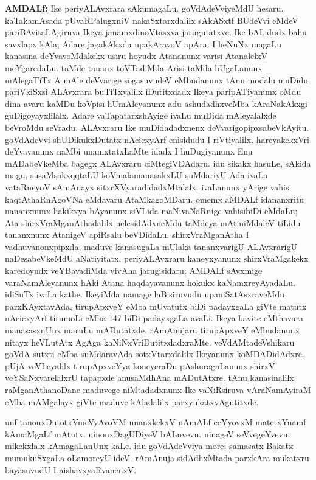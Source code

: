 {\large\textbf{AMDALf:}} Ike periyALAvxrara sAkumagaLu. goVdAdeVviyeMdU hesaru. kaTakamAsada pUvaRPalugxniV nakaSxtarxdalilx sAkASxtf BUdeVvi eMdeV pariBAvitaLAgiruva Ikeya janamxdinoVtasxva jarugutatxve. Ike bALidudx bahu savxlapx kAla; Adare jagakAkxda upakAravoV apAra. I heNuNx magaLu kanasina deYvavoMdakekx usiru hoyudx Atananunx varisi AtanalelxV meYgaredaLu. taMde tananx toVTadiMda Arisi taMda hUgaLanunx mAlegaTiTx A mAle deVvarige sogasuvudeV eMbudanunx tAnu modalu muDidu pariVkiSxsi ALAvxrara buTiTxyalilx iDutitxdadx Ikeya paripATiyanunx oMdu dina avaru kaMDu koVpisi hUmAleyanunx adu ashudadhxveMba kAraNakAkxgi guDigoyayxlilalx. Adare vaTapatarxshAyige ivaLu muDida mAleyalalxde beVroMdu seVradu. ALAvxraru Ike muDidadadxnenx deVvarigopipxsabeVkAyitu. goVdAdeVvi shUDikukxDutatx nAcicxyArf enisidudu I riVtiyalilx. hareyakekxVri deYvavanunx naMbi unamxtatxLaMte idadx I huDugiyanunx Enu mADabeVkeMba bagegx ALAvxraru ciMtegiVDAdaru. idu sikakx hasuLe, sAkida magu, susaMsakxqqtaLU koVmalamanasakxLU suMdariyU Ada ivaLa vataRneyoV sAmAnayx sitxrXVyaradidadxMtalalx. ivaLanunx yArige vahisi kaqtAthaRnAgoVNa eMdavaru AtaMkagoMDaru. omemx aMDALf idananxritu nananxnunx hakikxya bAyanunx siVLida maNivaNaRnige vahisibiDi eMdaLu; Ata shirxVraMganAthadalilx nelesidAdxneMdu taMdeya mAtiniMdaleV tiLidu tananxnunx AtanigeV apiRsalu beVDidaLu. shirxVraMganAtha I vadhuvanonxpipxda; maduve kanasugaLa mUlaka tananxvarigU ALAvxrarigU naDesabeVkeMdU aNatiyitatx. periyALAvxraru kaneyxyanunx shirxVraMgakekx karedoyudx veYBavadiMda vivAha jarugisidaru; AMDALf sAvxmige varaNamAleyanunx hAki Atana haqdayavanunx hokukx kaNamxreyAyadaLu. idiSuTx ivaLa kathe. IkeyiMda namage laBisiruvudu upaniSatAsxraveMdu parxKAyxtavAda, tirupApxveY eMba mUvatutx biDi padayxgaLa giVte matutx nAcicxyArf tirumoLi eMba {\rm 147} biDi padayxgaLa avaLi. Ikeya kavite eMthavara manasasxnUnx maruLu mADutatxde. rAmAnujaru tirupApxveY eMbudanunx nitayx heVLutAtx AgAga kaNiNxVriDutitxdadxraMte. veVdAMtadeVshikaru goVdA sutxti eMba suMdaravAda sotxVtarxdalilx Ikeyanunx koMDADidAdxre. pUjA veVLeyalilx tirupApxveYya koneyeraDu pAshuragaLanunx shirxV veYSaNxvarelalxrU tapapxde anusaMdhAna mADutAtxre. tAnu kanasinalilx raMganAthanoDane maduvege niMtadadxnunx Ike vaNiRsiruva vAraNamAyiraM eMba mAMgalayx giVte maduve kAladalilx parxyukatxvAgutitxde.

unf tanonxDutotxVmeVyAvoVM unanxkekxV nAmALf ceYyovxM matetxYnamf kAmaMgaLf mAtutx. ninonxDagUDiyeV bALuvevu. ninageV seVvegeYvevu. mikekxlalx kAmagaLanUnx kaLe. idu goVdAdeVviya more; samasatx Bakatx mumukuSxgaLa oLamoreyU ideV. rAmAnuja sidAdhxMtada parxkAra mukatxru bayasuvudU I aishavxyaRvanenxV.

